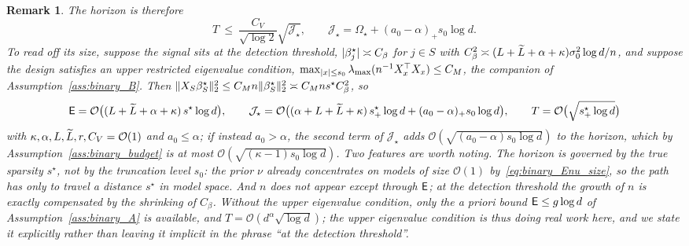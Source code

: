 \documentclass[aos]{imsart}%
\DeclarePairedDelimiter{\norm}{\lVert}{\rVert}
\DeclarePairedDelimiter{\abs}{\lvert}{\rvert}
\newcommand{\OO}{\mathcal{O}}  %
\theoremstyle{plain}
\newtheorem{remark}{Remark}[section]
\theoremstyle{definition}
\begin{document}
    \begin{remark}
        \label{rem:binary_E}
        The horizon is therefore
        \begin{equation}
            \label{eq:binary_T}
            T\ \leq\ \frac{C_V}{\sqrt{\log2}}\sqrt{\mathcal{J}_\star},
            \qquad
            \mathcal{J}_\star=\Omega_\star+(a_0-\alpha)_{+}s_0\log d .
        \end{equation}
        To read off its size, suppose the signal sits at the detection
        threshold, $\abs{\beta^\star_j}\asymp C_\beta$ for $j\in S$ with
        $C_\beta^{2}\asymp(L+\widetilde{L}+\alpha+\kappa)\sigma_0^{2}\log d/n$, and
        suppose the design satisfies an upper restricted eigenvalue condition,
        $\max_{\abs x\leq s_0}\lambda_{\max}(n^{-1}X_x^{\top}X_x)\leq C_M$,
        the companion of Assumption~\ref{ass:binary_B}. Then
        $\norm{X_S\beta^\star_S}_2^{2}\leq C_Mn\norm{\beta^\star_S}_2^{2}
        \asymp C_Mns^{\star}C_\beta^{2}$, so
        \begin{equation*}
            \Energy=\OO\bigl((L+\Ltil+\alpha+\kappa)\,s^{\star}\log d\bigr),
            \qquad
            \mathcal{J}_\star=\OO\bigl((\alpha+L+\Ltil+\kappa)\,
            s^\star_+\log d+(a_0-\alpha)_{+}s_0\log d\bigr),
            \qquad
            T=\OO\bigl(\sqrt{s^\star_+\log d}\bigr)
        \end{equation*}
        with $\kappa,\alpha,L,\Ltil,r,C_V=\OO(1)$ and $a_0\leq\alpha$; if
        instead $a_0>\alpha$, the second term of $\mathcal{J}_\star$ adds
        $\OO(\sqrt{(a_0-\alpha)s_0\log d})$ to the horizon, which by
        Assumption~\ref{ass:binary_budget} is at most
        $\OO(\sqrt{(\kappa-1)s_0\log d})$. Two features are worth noting. The horizon is governed by the true sparsity $s^{\star}$, not by
        the truncation level $s_0$: the prior $\nu$ already concentrates on
        models of size $\OO(1)$ by~\eqref{eq:binary_Enu_size}, so the path has
        only to travel a distance $s^{\star}$ in model space. And $n$ does not
        appear except through $\mathsf{E}$; at the detection threshold the growth
        of $n$ is exactly compensated by the shrinking of $C_\beta$. Without
        the upper eigenvalue condition, only the a priori bound
        $\mathsf{E}\leq g\log d$ of Assumption~\ref{ass:binary_A} is available,
        and $T=\OO(d^{\alpha}\sqrt{\log d})$; the upper eigenvalue condition is
        thus doing real work here, and we state it explicitly rather than
        leaving it implicit in the phrase ``at the detection threshold''.
    \end{remark}
\end{document}

